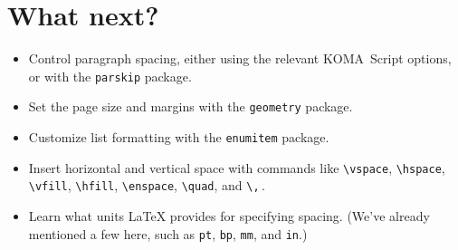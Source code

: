 \section{What next?}
\begin{itemize}
\item Control paragraph spacing, either using the relevant
KOMA~Script options, or with the \texttt{parskip} package.
\item Set the page size and margins with the \texttt{geometry} package.
\item Customize list formatting with the \texttt{enumitem} package.
\item Insert horizontal and vertical space with commands like
    \verb|\vspace|, \verb|\hspace|, \verb|\vfill|, \verb|\hfill|,
    \verb|\enspace|, \verb|\quad|, and \verb|\,|\,.
\item Learn what units \LaTeX{} provides for specifying spacing.
    (We've already mentioned a few here, such as
    \texttt{pt}, \texttt{bp}, \texttt{mm}, and \texttt{in}.)
\end{itemize}
